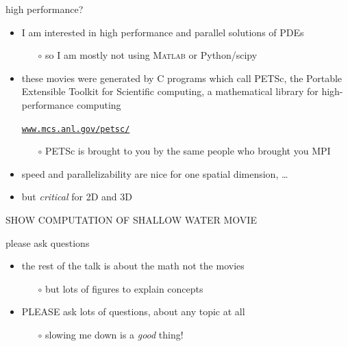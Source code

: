\documentclass[10pt,hyperref]{beamer}
\newcommand{\Matlab}{\textsc{Matlab}\xspace}
\begin{document}
\begin{frame}{high performance?}

\begin{itemize}
\item I am interested in high performance and parallel solutions of PDEs
    \begin{itemize}
    \item[$\circ$] so I am mostly not using \Matlab or Python/scipy
    \end{itemize}
\item these movies were generated by C programs which call PETSc, the Portable Extensible Toolkit for Scientific computing, a mathematical library for high-performance computing

    \begin{center}
    \href{https://www.mcs.anl.gov/petsc/}{\texttt{www.mcs.anl.gov/petsc/}}
    \end{center}

    \begin{itemize}
    \item[$\circ$] PETSc is brought to you by the same people who brought you MPI
    \end{itemize}
\item speed and parallelizability are nice for one spatial dimension, \dots
\item but \emph{critical} for 2D and 3D
\end{itemize}

\vspace{10mm}
\begin{center}
\alert{SHOW COMPUTATION OF SHALLOW WATER MOVIE}
\end{center}

\end{frame}


\begin{frame}{please ask questions}

\begin{itemize}
\item the rest of the talk is about the math not the movies
    \begin{itemize}
    \item[$\circ$] but lots of figures to explain concepts
    \end{itemize}
\item \alert{PLEASE} ask lots of questions, about any topic at all
    \begin{itemize}
    \item[$\circ$] slowing me down is a \emph{good} thing!
    \end{itemize}
\end{itemize}
\end{frame}
\end{document}
